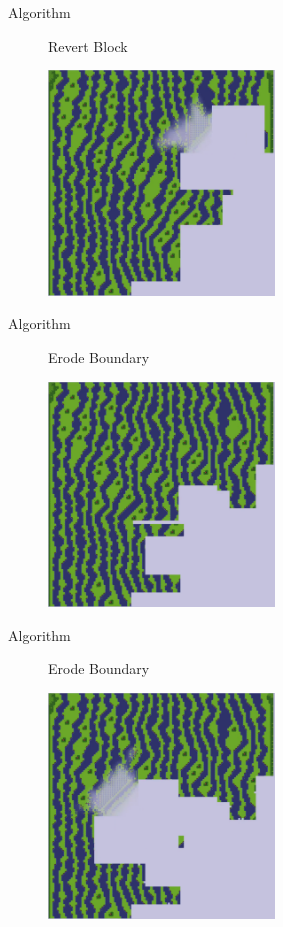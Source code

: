\documentclass{beamer}
\begin{document}
  \begin{frame}[fragile]{Algorithm}
    \begin{figure}
      Revert Block

      \includegraphics[width=6cm]{img/fm_0024.pdf}
    \end{figure}
  \end{frame}

  \begin{frame}[fragile]{Algorithm}

    \begin{figure}
      Erode Boundary

      \includegraphics[width=6cm]{img/fm_0035.pdf}
    \end{figure}
  \end{frame}

  \begin{frame}[fragile]{Algorithm}

    \begin{figure}
      Erode Boundary

      \includegraphics[width=6cm]{img/fm_0036.pdf}
    \end{figure}
  \end{frame}
\end{document}
